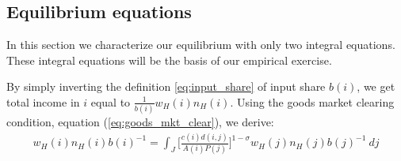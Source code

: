 \documentclass{article}
\begin{document}

\subsection{Equilibrium equations}

In this section we characterize our equilibrium with only two integral equations.  These integral equations will be the basis of our empirical exercise.  

By simply inverting the definition \eqref{eq:input_share} of input share $b(i)$, we get total income in $i$ equal to $\frac{1}{b(i)} w_H(i)n_H(i)$. Using the goods market clearing condition, equation (\ref{eq:goods_mkt_clear}), we derive: 
\begin{eqnarray}
	w_H(i) n_H(i) b(i)^{-1} = 
	\int_J \Big[ \frac{c(i) d(i,j)}{A(i) P(j)} \Big]^{1-\sigma} w_H(j) n_H(j) b(j)^{-1} ~dj \nonumber
\end{eqnarray}
\end{document}
